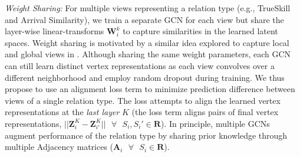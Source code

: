 \noindent
\emph{Weight Sharing:} For multiple views representing a relation type (e.g., TrueSkill and Arrival Similarity), we train a separate GCN for each view but share the layer-wise linear-transforms $\mathbf{W}_i^{k}$ to capture similarities in the learned latent spaces.
Weight sharing is motivated by a similar idea explored to capture local and global views in \cite{DualGCN}. Although sharing the same weight parameters, each GCN can still learn distinct vertex representations as each view convolves over a different neighborhood and employ random dropout during training.
We thus propose to use an alignment loss term to minimize prediction difference between views of a single relation type\cite{reg}. The loss attempts to align the learned vertex representations at the \emph{last layer} $K$ (the loss term aligns pairs of final vertex representations, $\lvert\lvert \mathbf{Z}_i^{K} - \mathbf{Z}_{i'}^{K} \lvert\lvert \texttt{  }\forall\texttt{ } S_i, S_i' \in \mathbf{R}$). In principle, multiple GCNs augment performance of the relation type by sharing prior knowledge through multiple Adjacency matrices ($\mathbf{A}_i \texttt{  }\forall\texttt{ } S_i \in \mathbf{R}$).


